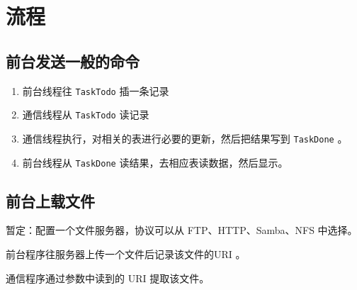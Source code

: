 \section{流程}\label{ux6d41ux7a0b}

\subsection{前台发送一般的命令}\label{ux524dux53f0ux53d1ux9001ux4e00ux822cux7684ux547dux4ee4}

\begin{enumerate}
\def\labelenumi{\arabic{enumi}.}
\itemsep1pt\parskip0pt
\item
  前台线程往 \texttt{TaskTodo} 插一条记录
\item
  通信线程从 \texttt{TaskTodo} 读记录
\item
  通信线程执行，对相关的表进行必要的更新，然后把结果写到
  \texttt{TaskDone} 。
\item
  前台线程从 \texttt{TaskDone} 读结果，去相应表读数据，然后显示。
\end{enumerate}

\subsection{前台上载文件}\label{ux524dux53f0ux4e0aux8f7dux6587ux4ef6}

暂定：配置一个文件服务器，协议可以从 FTP、HTTP、Samba、NFS 中选择。

前台程序往服务器上传一个文件后记录该文件的URI 。

通信程序通过参数中读到的 URI 提取该文件。
